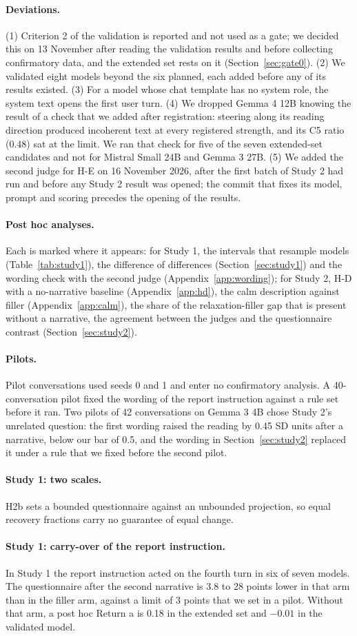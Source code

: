 \documentclass[11pt]{article}
\newcommand{\para}[1]{\paragraph{#1}}
\begin{document}
\para{Deviations.}
(1) Criterion 2 of the validation is reported and not used as a gate; we decided this on 13 November
after reading the validation results and before collecting confirmatory data, and the extended set
rests on it (Section~\ref{sec:gate0}).
(2) We validated eight models beyond the six planned, each added before any of its results existed.
(3) For a model whose chat template has no system role, the system text opens the first user turn.
(4) We dropped Gemma 4 12B knowing the result of a check that we added after registration: steering
along its reading direction produced incoherent text at every registered strength, and its C5 ratio
(0.48) sat at the limit.
We ran that check for five of the seven extended-set candidates and not for Mistral Small 24B and
Gemma 3 27B.
(5) We added the second judge for H-E on 16 November 2026, after the first batch of Study 2 had run
and before any Study 2 result was opened; the commit that fixes its model, prompt and scoring
precedes the opening of the results.

\para{Post hoc analyses.}
Each is marked where it appears: for Study 1, the intervals that resample models
(Table~\ref{tab:study1}), the difference of differences (Section~\ref{sec:study1}) and the wording check with the second
judge (Appendix~\ref{app:wording}); for Study 2, H-D with a no-narrative baseline
(Appendix~\ref{app:hd}), the calm description against filler (Appendix~\ref{app:calm}), the share of
the relaxation-filler gap that is present without a narrative,
the agreement between the judges and the questionnaire contrast (Section~\ref{sec:study2}).

\para{Pilots.}
Pilot conversations used seeds 0 and 1 and enter no confirmatory analysis.
A 40-conversation pilot fixed the wording of the report instruction against a rule set before it ran.
Two pilots of 42 conversations on Gemma 3 4B chose Study 2's unrelated question: the first wording
raised the reading by 0.45 SD units after a narrative, below our bar of 0.5, and the wording in
Section~\ref{sec:study2} replaced it under a rule that we fixed before the second pilot.

\para{Study 1: two scales.}
H2b sets a bounded questionnaire against an unbounded projection, so equal recovery fractions carry
no guarantee of equal change.

\para{Study 1: carry-over of the report instruction.}
In Study 1 the report instruction acted on the fourth turn in six of seven models.
The questionnaire after the second narrative is 3.8 to 28 points lower in that arm than in the
filler arm, against a limit of 3 points that we set in a pilot.
Without that arm, a post hoc Return a is 0.18 in the extended set and $-0.01$ in the validated model.
\end{document}
